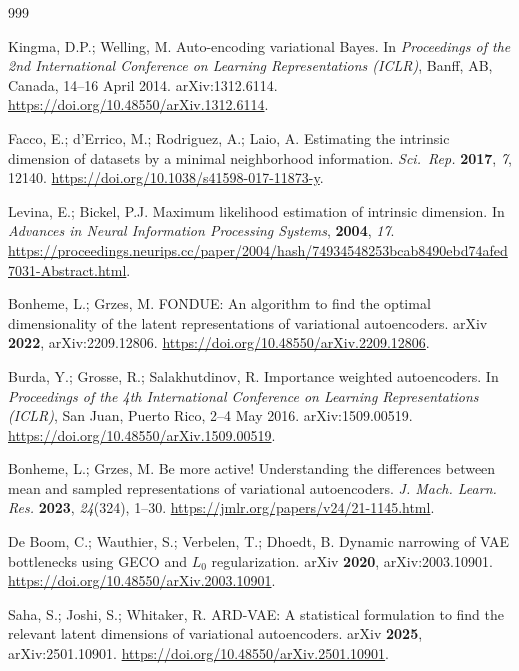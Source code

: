 \documentclass[11pt,a4paper]{ltjsarticle}
\begin{document}
\begin{thebibliography}{999}

Kingma, D.P.; Welling, M.
Auto-encoding variational Bayes.
In \textit{Proceedings of the 2nd International Conference on Learning
Representations (ICLR)}, Banff, AB, Canada, 14--16 April 2014.
arXiv:1312.6114. \url{https://doi.org/10.48550/arXiv.1312.6114}.

Facco, E.; d'Errico, M.; Rodriguez, A.; Laio, A.
Estimating the intrinsic dimension of datasets by a minimal neighborhood
information.
\textit{Sci.\ Rep.} \textbf{2017}, \textit{7}, 12140.
\url{https://doi.org/10.1038/s41598-017-11873-y}.

Levina, E.; Bickel, P.J.
Maximum likelihood estimation of intrinsic dimension.
In \textit{Advances in Neural Information Processing Systems},
\textbf{2004}, \textit{17}.
\url{https://proceedings.neurips.cc/paper/2004/hash/74934548253bcab8490ebd74afed7031-Abstract.html}.

Bonheme, L.; Grzes, M.
FONDUE: An algorithm to find the optimal dimensionality of the latent
representations of variational autoencoders.
arXiv \textbf{2022}, arXiv:2209.12806.
\url{https://doi.org/10.48550/arXiv.2209.12806}.

Burda, Y.; Grosse, R.; Salakhutdinov, R.
Importance weighted autoencoders.
In \textit{Proceedings of the 4th International Conference on Learning
Representations (ICLR)}, San Juan, Puerto Rico, 2--4 May 2016.
arXiv:1509.00519. \url{https://doi.org/10.48550/arXiv.1509.00519}.

Bonheme, L.; Grzes, M.
Be more active! Understanding the differences between mean and sampled
representations of variational autoencoders.
\textit{J. Mach. Learn. Res.} \textbf{2023}, \textit{24}(324), 1--30.
\url{https://jmlr.org/papers/v24/21-1145.html}.

De Boom, C.; Wauthier, S.; Verbelen, T.; Dhoedt, B.
Dynamic narrowing of VAE bottlenecks using GECO and $L_0$ regularization.
arXiv \textbf{2020}, arXiv:2003.10901.
\url{https://doi.org/10.48550/arXiv.2003.10901}.

Saha, S.; Joshi, S.; Whitaker, R.
ARD-VAE: A statistical formulation to find the relevant latent dimensions
of variational autoencoders.
arXiv \textbf{2025}, arXiv:2501.10901.
\url{https://doi.org/10.48550/arXiv.2501.10901}.


\end{thebibliography}
\end{document}
